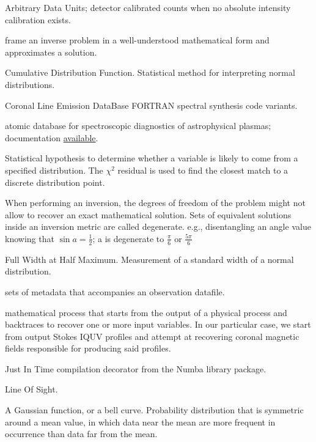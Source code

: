 \documentclass{article}
\begin{document}
\begin{description}
    [font=\normalfont,leftmargin=1.3in,style=multiline]
    \item[ADU]
    Arbitrary Data Units; detector calibrated counts when no absolute intensity calibration exists.
    \item[Analytical solution]
        frame an inverse problem in a well-understood mathematical form and  approximates a solution. 
    \item[CDF]
    		Cumulative Distribution Function. Statistical method for interpreting normal distributions. 
    \item[CLE \& CLEDB]
		Coronal Line Emission DataBase FORTRAN spectral synthesis code variants.
	\item[CHIANTI]
	atomic database for spectroscopic diagnostics of astrophysical plasmas; documentation \href{https://www.chiantidatabase.org/}{available}.
    \item[$\chi^2$ fitting solution]
        Statistical hypothesis to determine whether a variable is likely to come from a specified distribution. The $\chi^2$ residual is used to find the closest match to a discrete distribution point. 
    \item[Degeneracy]
        When performing an inversion, the degrees of freedom of the problem might not allow to recover an exact mathematical solution. Sets of equivalent solutions inside an inversion metric are called degenerate. e.g., disentangling an angle value knowing that $\sin a =\frac{1}{2}$; a is degenerate to $\frac{\pi}{6}$ or $\frac{5\pi}{6}$	
	\item[FWHM]
	Full Width at Half Maximum. Measurement of a standard width of a normal distribution.    
    \item[header (input file)]
        sets of metadata that accompanies an observation datafile.
    \item[Inversion]
        mathematical process that starts from the output of a physical 		process and backtraces to recover one or more input variables. In our particular case, we start from output Stokes IQUV profiles and attempt at recovering coronal magnetic fields responsible for producing said profiles.
	\item[JIT]
	Just In Time compilation decorator from the Numba library package.
    \item[LOS]
    		Line Of Sight.
    	\item[Normal distribution]
    	A Gaussian function, or a bell curve. Probability distribution that is symmetric around a mean value, in which data near the mean are more frequent in occurrence than data far from the mean. 

\end{description}
\end{document}
